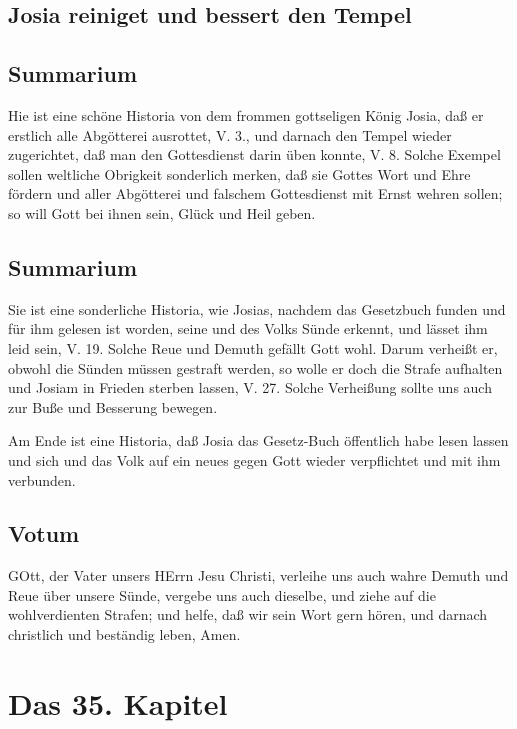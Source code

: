 \section[Josia reiniget und bessert den Tempel]{Josia reiniget und bessert den Tempel}

\section{Summarium}

Hie ist eine schöne Historia von dem frommen gottseligen König Josia, daß er erstlich alle Abgötterei ausrottet, V. 3., und darnach den Tempel wieder zugerichtet, daß man den Gottesdienst darin üben konnte, V. 8. Solche Exempel sollen weltliche Obrigkeit sonderlich merken, daß sie Gottes Wort und Ehre fördern und aller Abgötterei und falschem Gottesdienst mit Ernst wehren sollen; so will Gott bei ihnen sein, Glück und Heil geben.

\section{Summarium}

Sie ist eine sonderliche Historia, wie Josias, nachdem das Gesetzbuch funden und für ihm gelesen ist worden, seine und des Volks Sünde erkennt, und lässet ihm leid sein, V. 19. Solche Reue und Demuth gefällt Gott wohl. Darum verheißt er, obwohl die Sünden müssen gestraft werden, so wolle er doch die Strafe aufhalten und Josiam in Frieden sterben lassen, V. 27. Solche Verheißung sollte uns auch zur Buße und Besserung bewegen.

Am Ende ist eine Historia, daß Josia das Gesetz-Buch öffentlich habe lesen lassen und sich und das Volk auf ein neues gegen Gott wieder verpflichtet und mit ihm verbunden.

\section{Votum}

GOtt, der Vater unsers HErrn Jesu Christi, verleihe uns auch wahre Demuth und Reue über unsere Sünde, vergebe uns auch dieselbe, und ziehe auf die wohlverdienten Strafen; und helfe, daß wir sein Wort gern hören, und darnach christlich und beständig leben, Amen.

\chapter{Das 35. Kapitel}

